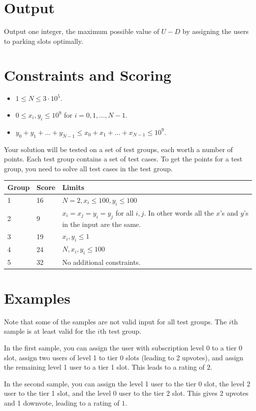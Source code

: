 \section*{Output}
Output one integer, the maximum possible value of $U-D$ by assigning the users to parking slots optimally.

\section*{Constraints and Scoring}
\begin{itemize}
\item $1 \leq N \leq 3 \cdot 10^5$.
\item $0 \leq x_i, y_i \leq 10^9$ for $i = 0,1,\ldots , N-1$.
\item $y_0+y_1+\ldots + y_{N-1} \leq x_0+x_1+\ldots + x_{N-1} \leq 10^9$.
\end{itemize}

Your solution will be tested on a set of test groups, each worth a number of points.
Each test group contains a set of test cases. To get the points for a test group, you need to
solve all test cases in the test group.

\begin{tabular}{|l|l|l|}
\hline
Group  &  Score  &  Limits \\
\hline
 1 & 16 & $N=2, x_i \leq 100, y_i \leq 100$ \\
\hline
 2 & 9 & $x_i = x_j = y_i = y_j$ for all $i,j$. In other words all the $x$'s and $y$'s in the input are the same. \\
\hline
 3 & 19 & $x_i, y_i \leq 1$ \\
\hline
 4 & 24 & $N,x_i,y_i \leq 100$  \\
\hline
 5 & 32 & No additional constraints. \\
\hline
\end{tabular}
\section*{Examples}
Note that some of the samples are not valid input for all test groups.
The $i$th sample is at least valid for the $i$th test group.

In the first sample, you can assign the user with subscription level 0 to a tier 0 slot,
assign two users of level 1 to tier 0 slots (leading to 2 upvotes), and assign the
remaining level 1 user to a tier 1 slot. This leads to a rating of $2$.

In the second sample, you can assign the level 1 user to the tier 0 slot, the level 2 user
to the tier 1 slot, and the level 0 user to the tier 2 slot. This gives 2 upvotes and
1 downvote, leading to a rating of $1$.

